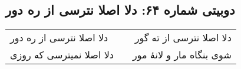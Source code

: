 \begin{center}
\section*{دوبیتی شماره ۶۴: دلا اصلا نترسی از ره دور}
\label{sec:064}
\begin{longtable}{l p{0.5cm} r}
دلا اصلا نترسی از ره دور
&&
دلا اصلا نترسی از ته گور
\\
دلا اصلا نمیترسی که روزی
&&
شوی بنگاه مار و لانهٔ مور
\\
\end{longtable}
\end{center}
